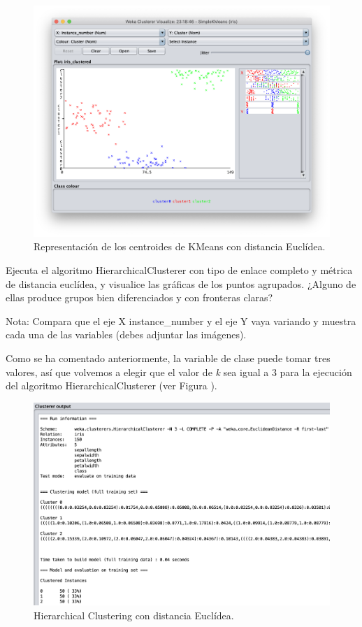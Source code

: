 \documentclass[11pt]{exam}
\begin{document}
\begin{questions}
\begin{parts}
\begin{figure}[h]
	\centering
	\includegraphics[scale=0.4]{kmeans_euclidea_centroides_graph.png}
	\caption{Representación de los centroides de KMeans con distancia Euclídea.}
	\label{Captura_5}
\end{figure}

\end{parts}

{\question Ejecuta el algoritmo HierarchicalClusterer con tipo de enlace completo y métrica de distancia euclídea, y visualice las gráficas de los puntos agrupados. ¿Alguno de ellas produce grupos bien diferenciados y con fronteras claras?}

Nota: Compara que el eje X instance\_number y el eje Y vaya variando y muestra cada una de las variables (debes adjuntar las imágenes).

Como se ha comentado anteriormente, la variable de clase puede tomar tres valores, así que volvemos a elegir que el valor de \textit{k} sea igual a 3 para la ejecución del algoritmo HierarchicalClusterer (ver Figura ).

\begin{figure}[h]
	\centering
	\includegraphics[scale=0.4]{hc_euclidea.png}
	\caption{Hierarchical Clustering con distancia Euclídea.}
	\label{Captura_6}
\end{figure}


\end{questions}
\end{document}
